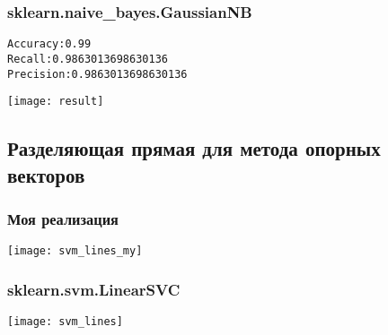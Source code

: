 \subsubsection{sklearn.naive\_bayes.GaussianNB}
\begin{alltt}
Accuracy: 0.99
Recall: 0.9863013698630136
Precision: 0.9863013698630136
\end{alltt}
\begin{center}
\texttt{[image: result]}
\end{center}
\pagebreak

\subsection{Разделяющая прямая для метода опорных векторов}
\subsubsection{Моя реализация}
\begin{center}
\texttt{[image: svm\_lines\_my]}
\end{center}
\pagebreak

\subsubsection{sklearn.svm.LinearSVC}
\begin{center}
\texttt{[image: svm\_lines]}
\end{center}

\pagebreak
